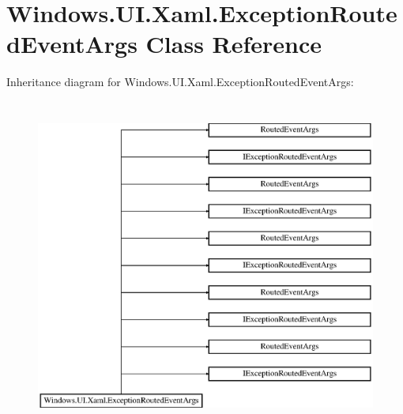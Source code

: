 \hypertarget{class_windows_1_1_u_i_1_1_xaml_1_1_exception_routed_event_args}{}\section{Windows.\+U\+I.\+Xaml.\+Exception\+Routed\+Event\+Args Class Reference}
\label{class_windows_1_1_u_i_1_1_xaml_1_1_exception_routed_event_args}
Inheritance diagram for Windows.\+U\+I.\+Xaml.\+Exception\+Routed\+Event\+Args\+:\begin{figure}[H]
\begin{center}
\leavevmode
\includegraphics[height=11.000000cm]{class_windows_1_1_u_i_1_1_xaml_1_1_exception_routed_event_args}
\end{center}
\end{figure}

